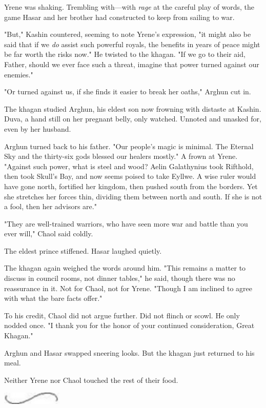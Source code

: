 Yrene was shaking.
Trembling with---with \emph{rage} at the careful play of words, the game Hasar and her brother had constructed to keep from sailing to war.

"But," Kashin countered, seeming to note Yrene's expression, "it might also be said that if we \emph{do} assist such powerful royals, the benefits in years of peace might be far worth the risks now."
He twisted to the khagan.
"If we go to their aid, Father, should we ever face such a threat, imagine that power turned against our enemies."

"Or turned against us, if she finds it easier to break her oaths," Arghun cut in.

The khagan studied Arghun, his eldest son now frowning with distaste at Kashin.
Duva, a hand still on her pregnant belly, only watched.
Unnoted and unasked for, even by her husband.

Arghun turned back to his father.
"Our people's magic is minimal.
The Eternal Sky and the thirty-six gods blessed our healers mostly."
A frown at Yrene.
"Against such power, what is steel and wood?
Aelin Galathynius took Rifthold, then took Skull's Bay, and now seems poised to take Eyllwe.
A wise ruler would have gone north, fortified her kingdom, then pushed south from the borders.
Yet she stretches her forces thin, dividing them between north and south.
If she is not a fool, then her advisors are."

"They are well-trained warriors, who have seen more war and battle than you ever will," Chaol said coldly.

The eldest prince stiffened.
Hasar laughed quietly.

The khagan again weighed the words around him.
"This remains a matter to discuss in council rooms, not dinner tables," he said, though there was no reassurance in it.
Not for Chaol, not for Yrene.
"Though I am inclined to agree with what the bare facts offer."

To his credit, Chaol did not argue further.
Did not flinch or scowl.
He only nodded once.
"I thank you for the honor of your continued consideration, Great Khagan."

Arghun and Hasar swapped sneering looks.
But the khagan just returned to his meal.

Neither Yrene nor Chaol touched the rest of their food.

\begin{center}
	\includegraphics[width=1.12in,height=0.24in]{images/seperator}
\end{center}

